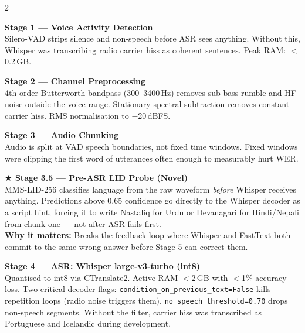 \documentclass[11pt,a4paper]{article}
\begin{document}
\begin{multicols}{2}

\begin{stageblue}
\textbf{\color{Royal}Stage 1 --- Voice Activity Detection}\\
\small Silero-VAD strips silence and non-speech before ASR sees anything. Without this, Whisper was transcribing radio carrier hiss as coherent sentences. Peak RAM: $<$0.2\,GB.
\end{stageblue}

\vspace{4pt}

\begin{stageblue}
\textbf{\color{Royal}Stage 2 --- Channel Preprocessing}\\
\small 4th-order Butterworth bandpass (300--3400\,Hz) removes sub-bass rumble and HF noise outside the voice range. Stationary spectral subtraction removes constant carrier hiss. RMS normalisation to $-$20\,dBFS.
\end{stageblue}

\vspace{4pt}

\begin{stageblue}
\textbf{\color{Royal}Stage 3 --- Audio Chunking}\\
\small Audio is split at VAD speech boundaries, not fixed time windows. Fixed windows were clipping the first word of utterances often enough to measurably hurt WER.
\end{stageblue}

\vspace{4pt}

\begin{stageorange}
\textbf{\color{DOrange}$\bigstar$ Stage 3.5 --- Pre-ASR LID Probe (Novel)}\\
\small MMS-LID-256 classifies language from the raw waveform \textit{before} Whisper receives anything. Predictions above 0.65 confidence go directly to the Whisper decoder as a script hint, forcing it to write Nastaliq for Urdu or Devanagari for Hindi/Nepali from chunk one --- not after ASR fails first.\\[3pt]
\textbf{Why it matters:} Breaks the feedback loop where Whisper and FastText both commit to the same wrong answer before Stage 5 can correct them.
\end{stageorange}

\columnbreak

\begin{stageblue}
\textbf{\color{Royal}Stage 4 --- ASR: Whisper large-v3-turbo (int8)}\\
\small Quantised to int8 via CTranslate2. Active RAM $<$2\,GB with $<$1\% accuracy loss. Two critical decoder flags: \texttt{condition\_on\_previous\_text=False} kills repetition loops (radio noise triggers them), \texttt{no\_speech\_threshold=0.70} drops non-speech segments. Without the filter, carrier hiss was transcribed as Portuguese and Icelandic during development.
\end{stageblue}


\end{multicols}
\end{document}
